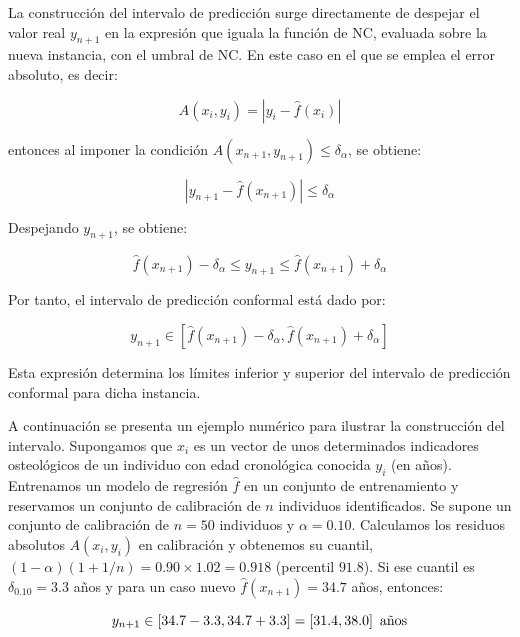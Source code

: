 La construcción del intervalo de predicción surge directamente de despejar el valor real $y_{n+1}$ en la expresión que iguala la función de \acrshort{NC}, evaluada sobre la nueva instancia, con el umbral de \acrshort{NC}. En este caso en el que se emplea el error absoluto, es decir:

$$
A(x_i, y_i) = | y_i - \hat{f}(x_i) |
$$

entonces al imponer la condición $A(x_{n+1}, y_{n+1}) \le \delta_\alpha$, se obtiene: 

$$
|y_{n+1}-\hat{f}(x_{n+1})| \le \delta_\alpha
$$

Despejando $y_{n+1}$, se obtiene:

$$
\hat{f}(x_{n+1}) - \delta_\alpha \le y_{n+1} \le \hat{f}(x_{n+1}) + \delta_\alpha 
$$

Por tanto, el intervalo de predicción conformal está dado por:

$$
y_{n+1} \in \left[ \hat{f}(x_{n+1})-\delta_\alpha , \hat{f}(x_{n+1})+\delta_\alpha  \right] 
$$

Esta expresión determina los límites inferior y superior del intervalo de predicción conformal para dicha
instancia.


A continuación se presenta un ejemplo numérico para ilustrar la construcción del intervalo. Supongamos que $x_i$ es un vector de unos determinados indicadores osteológicos de un individuo con edad cronológica conocida $y_i$ (en años). Entrenamos un modelo de regresión $\hat{f}$ en un conjunto de entrenamiento y reservamos un conjunto de calibración de $n$ individuos identificados.
Se supone un conjunto de calibración de $n=50$ individuos y $\alpha=0.10$. Calculamos los residuos absolutos $A(x_i,y_i)$ en calibración y obtenemos su cuantil, $(1-\alpha)(1+1/n)=0.90\times1.02=0.918$ (percentil $91.8$). Si ese cuantil es $\delta_{0.10}=3.3$ años y para un caso nuevo $\hat{f}(x_{n+1})=34.7$ años, entonces:

$$
y_{n+1} \in \left[ 34.7 - 3.3 , 34.7 + 3.3  \right] = \left[ 31.4 , 38.0 \right] \textnormal{ años}
$$


